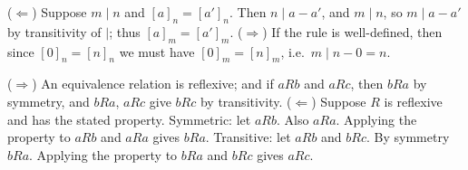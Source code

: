  ($\Leftarrow$) Suppose $m\mid n$ and $[a]_n=[a']_n$. Then $n\mid a-a'$, and $m\mid n$, so $m\mid a-a'$ by transitivity of $\mid$; thus $[a]_m=[a']_m$. ($\Rightarrow$) If the rule is well-defined, then since $[0]_n=[n]_n$ we must have $[0]_m=[n]_m$, i.e.\ $m\mid n-0=n$.

 ($\Rightarrow$) An equivalence relation is reflexive; and if $aRb$ and $aRc$, then $bRa$ by symmetry, and $bRa$, $aRc$ give $bRc$ by transitivity. ($\Leftarrow$) Suppose $R$ is reflexive and has the stated property. Symmetric: let $aRb$. Also $aRa$. Applying the property to $aRb$ and $aRa$ gives $bRa$. Transitive: let $aRb$ and $bRc$. By symmetry $bRa$. Applying the property to $bRa$ and $bRc$ gives $aRc$.
